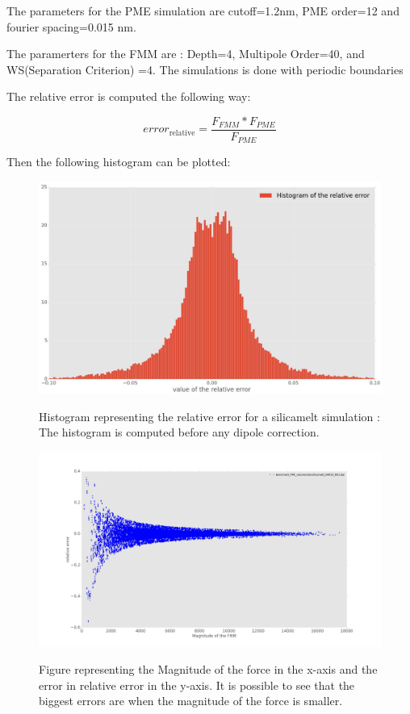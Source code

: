 \documentclass[12pt,twoside,a4paper]{report}
\begin{document}
The parameters for the PME simulation are cutoff=1.2nm, PME order=12 and fourier spacing=0.015 nm. 

The paramerters for the FMM are : Depth=4, Multipole Order=40, and WS(Separation Criterion) =4. The simulations is done with periodic boundaries 

The relative error is computed the following way:

\begin{equation}
	error_{\text{relative}} = \frac{F_{FMM} * F_{PME}}{F_{PME}}
\end{equation}

Then the following histogram can be plotted:

\begin{figure}[H]
  \label{hist_correction} 
   \includegraphics[scale=0.35]{hist_nocorrection.jpeg}
   \label{hist_correction} 
    \centering 
    \caption{Histogram representing the relative error for a silicamelt simulation : The histogram is computed before any dipole correction.}   
  \label{hist_correction} 
   \end{figure}   


	\begin{figure}[H]
	
	\includegraphics[scale=0.23]{magErr_noCorrection.jpeg}
	 \label{fig:mag_noCorr}  
	\centering 
    \caption{Figure representing the Magnitude of the force in the x-axis and the  error in relative error in the y-axis. It is possible to see that the biggest errors are when the magnitude of the force is smaller.}    
	 \label{fig:mag_noCorr}     
      \end{figure}  
\end{document}
